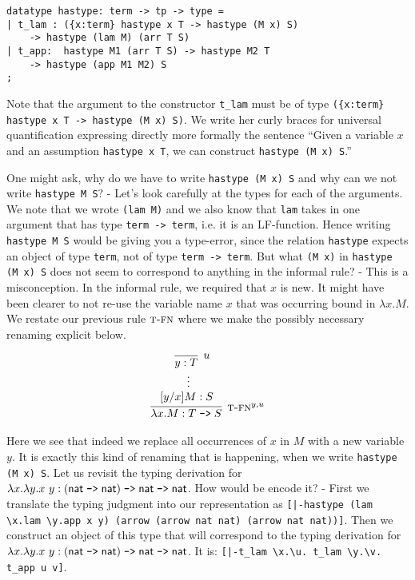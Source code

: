 \begin{lstlisting}
datatype hastype: term -> tp -> type =
| t_lam : ({x:term} hastype x T -> hastype (M x) S)
	-> hastype (lam M) (arr T S)
| t_app:  hastype M1 (arr T S) -> hastype M2 T
	-> hastype (app M1 M2) S
;
\end{lstlisting}

Note that the argument to the constructor \lstinline!t_lam! must be of type
\lstinline!({x:term} hastype x T -> hastype (M x) S)!. We write her curly braces
for universal quantification expressing directly more formally the sentence
``Given a variable $x$ and an assumption \lstinline!hastype x T!, we can
construct \lstinline!hastype (M x) S!.''

One might ask, why do we have to write \lstinline!hastype (M x) S! and why can
we not write \lstinline!hastype M S!? - Let's look carefully at the types for
each of the arguments. We note that we wrote \lstinline!(lam M)! and we also
know that \lstinline!lam! takes in one argument that has type
\lstinline!term -> term!, i.e. it is an LF-function. Hence writing \lstinline!hastype M S! would be
giving you a type-error, since the relation \lstinline!hastype! expects an
object of type \lstinline!term!, not of type \lstinline!term -> term!.
But what \lstinline!(M x)! in \lstinline!hastype (M x) S! does not seem to
correspond to anything in the informal rule? - This is a misconception. In the
informal rule, we required that $x$ is new. It might have been clearer to not
re-use the variable name $x$ that was occurring bound in $\lambda
x.M$. We restate our previous rule $\textsc{t-fn}$ where we make the possibly necessary
renaming explicit below.

\[
\begin{array}{c}
\infer[\TFn^{y,u}]{\lambda x.M : T \arrow S}{
  \begin{array}{c}
  \infer[u]{y:T}{} \\
  \vdots~~\\
   ~[y/x]M : S~~~~
  \end{array}
}
\end{array}
\]

Here we see that indeed we replace all occurrences of $x$ in $M$ with a new
variable $y$. It is exactly this kind of renaming that is happening, when we
write \lstinline!hastype (M x) S!.
\noindent
Let us revisit the typing derivation for $\lambda x.\lambda y.x~y : (\textsf{nat} \mathrel{\texttt{->}}
\textsf{nat}) \mathrel{\texttt{->}} \textsf{nat} \mathrel{\texttt{->}} \textsf{nat}$. How would be encode it? - First we translate the
typing judgment into our representation as
\lstinline![|-hastype (lam \x.lam \y.app x y) (arrow (arrow nat nat) (arrow nat nat))]!.
Then we construct an object of this type that will correspond to the typing
derivation for  $\lambda x.\lambda y.x~y : (\textsf{nat} \mathrel{\texttt{->}}
\textsf{nat}) \mathrel{\texttt{->}} \textsf{nat} \mathrel{\texttt{->}} \textsf{nat}$.
%
It is: \lstinline![|-t_lam \x.\u. t_lam \y.\v. t_app u v]!.


